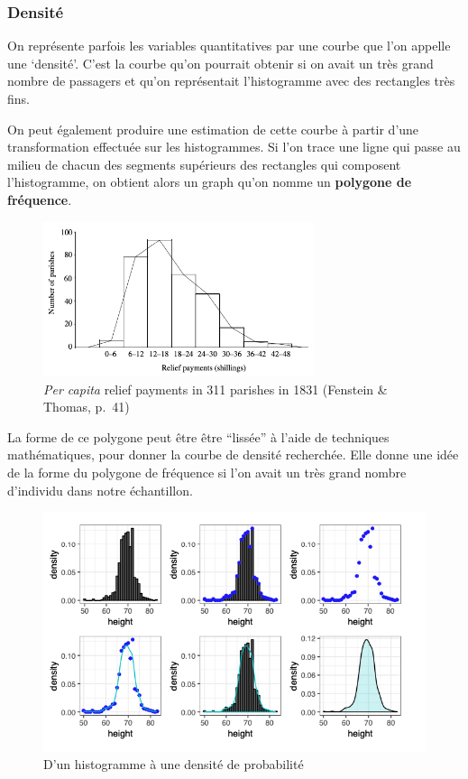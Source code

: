\documentclass[
  french,
]{book}
\begin{document}
\hypertarget{densituxe9}{%
\subsubsection{Densité}\label{densituxe9}}

On représente parfois les variables quantitatives par une courbe que l'on appelle une `densité'. C'est la courbe qu'on pourrait obtenir si on avait un très grand nombre de passagers et qu'on représentait l'histogramme avec des rectangles très fins.

On peut également produire une estimation de cette courbe à partir d'une transformation effectuée sur les histogrammes. Si l'on trace une ligne qui passe au milieu de chacun des segments supérieurs des rectangles qui composent l'histogramme, on obtient alors un graph qu'on nomme un \textbf{polygone de fréquence}.

\begin{figure}
\centering
\includegraphics[width=3.125in,height=\textheight]{images/frequencypol.png}
\caption{\emph{Per capita} relief payments in 311 parishes in 1831 (Fenstein \& Thomas, p.~41)}
\end{figure}

La forme de ce polygone peut être être ``lissée'' à l'aide de techniques mathématiques, pour donner la courbe de densité recherchée. Elle donne une idée de la forme du polygone de fréquence si l'on avait un très grand nombre d'individu dans notre échantillon.

\begin{figure}
\centering
\includegraphics{images/density.png}
\caption{D'un histogramme à une densité de probabilité}
\end{figure}
\end{document}
